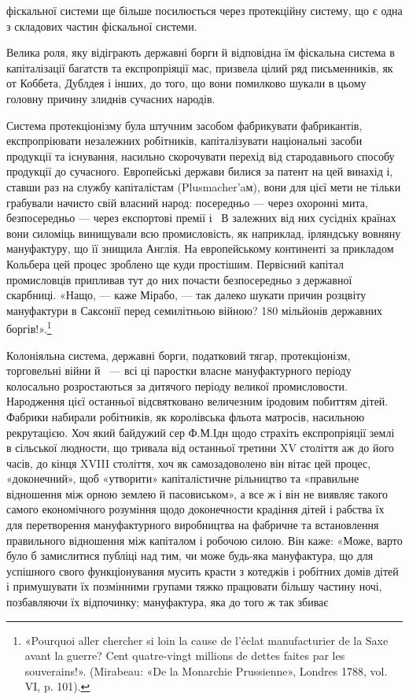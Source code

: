 \parcont{}  %
фіскальної системи ще більше посилюється через протекційну систему, що є одна з складових частин
фіскальної системи.

Велика роля, яку відіграють державні борги й відповідна їм фіскальна система в капіталізації
багатств та експропріяції мас, призвела цілий ряд письменників, як от Коббета, Дублдея і інших, до
того, що вони помилково шукали в цьому головну
причину злиднів сучасних народів.

Система протекціонізму була штучним засобом фабрикувати фабрикантів, експропріювати незалежних
робітників, капіталізувати національні засоби продукції та існування, насильно скорочувати перехід
від стародавнього способу продукції до сучасного. Европейські держави билися за патент на цей
винахід і, ставши раз на службу капіталістам (Plusmacher’aм), вони для цієї мети не тільки грабували
начисто свій власний народ: посередньо — через охоронні мита, безпосередньо — через експортові
премії і~ В залежних від них сусідніх країнах вони силоміць
винищували всю промисловість, як наприклад, ірляндську вовняну мануфактуру, що її знищила Англія. На
европейському континенті за прикладом Кольбера цей процес зроблено ще куди простішим. Первісний
капітал промисловців припливав тут до
них почасти безпосередньо з державної скарбниці. «Нащо, — каже Мірабо, — так далеко шукати причин
розцвіту мануфактури в Саксонії перед семилітньою війною? 180 мільйонів державних боргів!».\footnote{
«Pourquoi aller chercher si loin la cause de l’éclat manufacturier de la Saxe avant la guerre?
Cent quatre-vingt millions de dettes faites par les souverains!». (Mirabeau: «De la Monarchie
Prussienne», Londres 1788, vol. VI, p. 101).
}

Колоніяльна система, державні борги, податковий тягар, протекціонізм, торговельні війни й~ —
всі ці паростки власне мануфактурного періоду колосально розростаються за дитячого періоду великої
промисловости. Народження цієї останньої
відсвятковано величезним іродовим побиттям дітей. Фабрики набирали робітників, як королівська фльота
матросів, насильною рекрутацією. Хоч який байдужий сер Ф.М.Ідн щодо страхіть експропріяції землі в
сільської людности, що тривала від останньої
третини XV століття аж до його часів, до кінця XVIII століття, хоч як самозадоволено він вітає цей
процес, «доконечний», щоб «утворити» капіталістичне рільництво та «правильне відношення між орною
землею й пасовиськом», а все ж і він не виявляє такого самого економічного розуміння щодо
доконечности крадіння дітей і рабства їх для перетворення мануфактурного виробництва на фабричне та
встановлення правильного відношення між капіталом і робочою силою. Він каже: «Може, варто було б
замислитися публіці над тим, чи може будь-яка мануфактура, що для успішного свого функціонування
мусить красти з котеджів і робітних домів дітей і примушувати їх позмінними групами тяжко працювати
більшу частину ночі, позбавляючи їх відпочинку; мануфактура, яка до того ж так збиває
\parbreak{}  %

